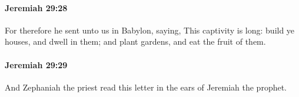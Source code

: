 		\paragraph{Jeremiah 29:28} %
			\label{JEREMIAH-29-28}

			For therefore he sent unto us in Babylon, saying, This captivity is long: build ye houses, and dwell in them; and plant gardens, and eat the fruit of them.


		\paragraph{Jeremiah 29:29} %
			\label{JEREMIAH-29-29}

			And Zephaniah the priest read this letter in the ears of Jeremiah the prophet.


